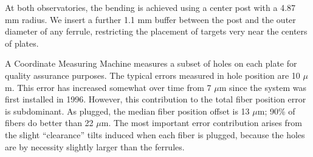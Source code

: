 At both observatories, the bending is achieved using a center post
with a 4.87 mm radius. We insert a further 1.1 mm buffer between the
post and the outer diameter of any ferrule, restricting the placement
of targets very near the centers of plates.

A Coordinate Measuring Machine measures a subset of holes on each
plate for quality assurance purposes. The typical errors measured in
hole position are 10 $\mu$m. This error has increased somewhat over
time from 7 $\mu$m since the system was first installed in
1996. However, this contribution to the total fiber position error is
subdominant.  As plugged, the median fiber position offset is 13
$\mu$m; 90\% of fibers do better than 22 $\mu$m.  The most important
error contribution arises from the slight ``clearance'' tilts induced
when each fiber is plugged, because the holes are by necessity
slightly larger than the ferrules.
